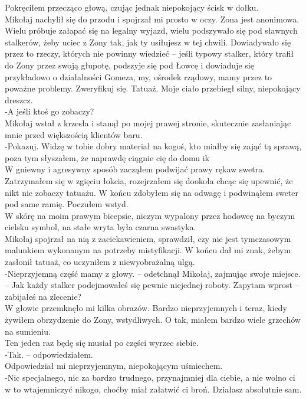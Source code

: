 \documentclass[../MAIN.tex]{subfiles}
\begin{document}
\qd
Pokręciłem przecząco głową, czując jednak niepokojący ścisk w dołku.\\
Mikołaj nachylił się do przodu i spojrzał mi prosto w oczy.
% 
\sx Zona jest anonimowa. Wielu próbuje załapać się na legalny wyjazd, wielu podszywało się pod sławnych stalkerów, żeby uciec z Zony tak, jak ty usiłujesz w tej chwili. Dowiadywało się przez to rzeczy, których nie powinny wiedzieć -- jeśli typowy stalker, który trafił do Zony przez swoją głupotę, podszyje się pod Łowcę i dowiaduje się przykładowo o działalności Gomeza, my, ośrodek rządowy, mamy przez to poważne problemy. Zweryfikuj się. Tatuaż.
\qd
Moje ciało przebiegł silny, niepokojący dreszcz.\\
-A jeśli ktoś go zobaczy?\\
Mikołaj wstał z krzesła i stanął po mojej prawej stronie, skutecznie zasłaniając mnie przed większością klientów baru.\\
-Pokazuj. Widzę w tobie dobry materiał na kogoś, kto miałby się zająć tą sprawą, poza tym słyszałem, że naprawdę ciągnie cię do domu i\3k\\
W gniewny i agresywny sposób zacząłem podwijać prawy rękaw swetra. Zatrzymałem się w zgięciu łokcia, rozejrzałem się dookoła chcąc się upewnić, że nikt nie zobaczy tatuażu. W końcu zdobyłem się na odwagę i podwinąłem sweter pod same ramię. Poczułem wstyd.\\
W skórę na moim prawym bicepsie, niczym wypalony przez hodowcę na byczym cielsku symbol, na stałe wryta była czarna swastyka.\\
Mikołaj spojrzał na nią z zaciekawieniem, sprawdził, czy nie jest tymczasowym malunkiem wykonanym na potrzeby mistyfikacji. W końcu dał mi znak, żebym zasłonił tatuaż, co uczyniłem z niewyobrażalną ulgą.\\
-Nieprzyjemną część mamy z głowy. -- odetchnął Mikołaj, zajmując swoje miejsce. -- Jak każdy stalker podejmowałeś się pewnie niejednej roboty. Zapytam wprost -- zabijałeś na zlecenie?\\
W głowie przemknęło mi kilka obrazów. Bardzo nieprzyjemnych i teraz, kiedy żywiłem obrzydzenie do Zony, wstydliwych. O tak, miałem bardzo wiele grzechów na sumieniu.\\
Ten jeden raz będę się musiał po części wyrzec siebie.\\
-Tak. -- odpowiedziałem.\\
Odpowiedział mi nieprzyjemnym, niepokojącym uśmiechem.\\
-Nic specjalnego, nic za bardzo trudnego, przynajmniej dla ciebie, a nie wolno ci w to wtajemniczyć nikogo, choćby miał załatwić ci broń. Działasz absolutnie sam.\\
\end{document}
